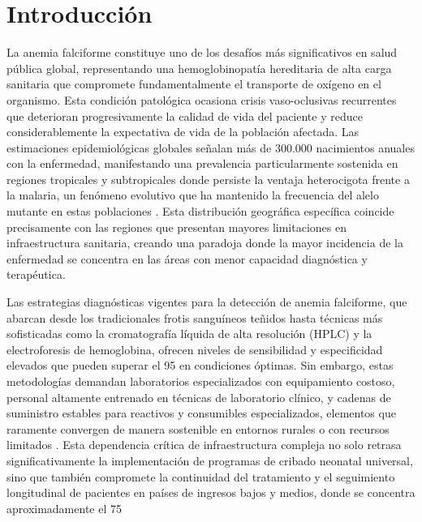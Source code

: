 \chapter{Introducción}\label{chap:introduccion}

La anemia falciforme constituye uno de los desafíos más significativos en salud pública global, representando una hemoglobinopatía hereditaria de alta carga sanitaria que compromete fundamentalmente el transporte de oxígeno en el organismo. Esta condición patológica ocasiona crisis vaso-oclusivas recurrentes que deterioran progresivamente la calidad de vida del paciente y reduce considerablemente la expectativa de vida de la población afectada. Las estimaciones epidemiológicas globales señalan más de 300.000 nacimientos anuales con la enfermedad, manifestando una prevalencia particularmente sostenida en regiones tropicales y subtropicales donde persiste la ventaja heterocigota frente a la malaria, un fenómeno evolutivo que ha mantenido la frecuencia del alelo mutante en estas poblaciones \cite{Arishi2021}. Esta distribución geográfica específica coincide precisamente con las regiones que presentan mayores limitaciones en infraestructura sanitaria, creando una paradoja donde la mayor incidencia de la enfermedad se concentra en las áreas con menor capacidad diagnóstica y terapéutica.

Las estrategias diagnósticas vigentes para la detección de anemia falciforme, que abarcan desde los tradicionales frotis sanguíneos teñidos hasta técnicas más sofisticadas como la cromatografía líquida de alta resolución (HPLC) y la electroforesis de hemoglobina, ofrecen niveles de sensibilidad y especificidad elevados que pueden superar el {95} en condiciones óptimas. Sin embargo, estas metodologías demandan laboratorios especializados con equipamiento costoso, personal altamente entrenado en técnicas de laboratorio clínico, y cadenas de suministro estables para reactivos y consumibles especializados, elementos que raramente convergen de manera sostenible en entornos rurales o con recursos limitados \cite{McGann2017,Shrestha2025}. Esta dependencia crítica de infraestructura compleja no solo retrasa significativamente la implementación de programas de cribado neonatal universal, sino que también compromete la continuidad del tratamiento y el seguimiento longitudinal de pacientes en países de ingresos bajos y medios, donde se concentra aproximadamente el 75%

